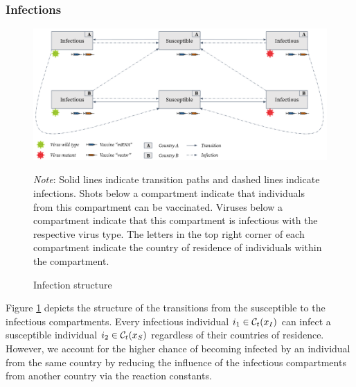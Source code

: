 \subsubsection{Infections}
\begin{figure}[h!]
\centering
\includegraphics[scale=0.3]{images/overview_infection.png}\\
\begin{flushleft}
\scriptsize{\textit{Note}: Solid lines indicate transition paths and dashed lines indicate infections. Shots below a compartment indicate that individuals from this compartment can be vaccinated. Viruses below a compartment indicate that this compartment is infectious with the respective virus type. The letters in the top right corner of each compartment indicate the country of residence of individuals within the compartment.}
\end{flushleft}
\caption{Infection structure}
\label{fig:model_infections}
\end{figure}
Figure \ref{fig:model_infections} depicts the structure of the transitions from the susceptible to the infectious compartments. Every infectious individual $i_1 \in \mathcal{C}_t(x_I)$ can infect a susceptible individual $i_2 \in \mathcal{C}_t(x_S)$ regardless of their countries of residence. However, we account for the higher chance of becoming infected by an individual from the same country by reducing the influence of the infectious compartments from another country via the reaction constants. \\


